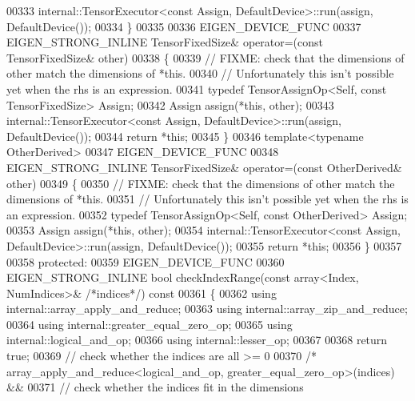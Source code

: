 \begin{DoxyCode}
00333       internal::TensorExecutor<const Assign, DefaultDevice>::run(assign, DefaultDevice());
00334     \}
00335 
00336     EIGEN\_DEVICE\_FUNC
00337     EIGEN\_STRONG\_INLINE TensorFixedSize& operator=(\textcolor{keyword}{const} TensorFixedSize& other)
00338     \{
00339       \textcolor{comment}{// FIXME: check that the dimensions of other match the dimensions of *this.}
00340       \textcolor{comment}{// Unfortunately this isn't possible yet when the rhs is an expression.}
00341       \textcolor{keyword}{typedef} TensorAssignOp<Self, const TensorFixedSize> Assign;
00342       Assign assign(*\textcolor{keyword}{this}, other);
00343       internal::TensorExecutor<const Assign, DefaultDevice>::run(assign, DefaultDevice());
00344       \textcolor{keywordflow}{return} *\textcolor{keyword}{this};
00345     \}
00346     \textcolor{keyword}{template}<\textcolor{keyword}{typename} OtherDerived>
00347     EIGEN\_DEVICE\_FUNC
00348     EIGEN\_STRONG\_INLINE TensorFixedSize& operator=(\textcolor{keyword}{const} OtherDerived& other)
00349     \{
00350       \textcolor{comment}{// FIXME: check that the dimensions of other match the dimensions of *this.}
00351       \textcolor{comment}{// Unfortunately this isn't possible yet when the rhs is an expression.}
00352       \textcolor{keyword}{typedef} TensorAssignOp<Self, const OtherDerived> Assign;
00353       Assign assign(*\textcolor{keyword}{this}, other);
00354       internal::TensorExecutor<const Assign, DefaultDevice>::run(assign, DefaultDevice());
00355       \textcolor{keywordflow}{return} *\textcolor{keyword}{this};
00356     \}
00357 
00358   \textcolor{keyword}{protected}:
00359     EIGEN\_DEVICE\_FUNC
00360     EIGEN\_STRONG\_INLINE \textcolor{keywordtype}{bool} checkIndexRange(\textcolor{keyword}{const} array<Index, NumIndices>& \textcolor{comment}{/*indices*/})\textcolor{keyword}{ const}
00361 \textcolor{keyword}{    }\{
00362       \textcolor{keyword}{using} internal::array\_apply\_and\_reduce;
00363       \textcolor{keyword}{using} internal::array\_zip\_and\_reduce;
00364       \textcolor{keyword}{using} internal::greater\_equal\_zero\_op;
00365       \textcolor{keyword}{using} internal::logical\_and\_op;
00366       \textcolor{keyword}{using} internal::lesser\_op;
00367 
00368       \textcolor{keywordflow}{return} \textcolor{keyword}{true};
00369         \textcolor{comment}{// check whether the indices are all >= 0}
00370           \textcolor{comment}{/*       array\_apply\_and\_reduce<logical\_and\_op, greater\_equal\_zero\_op>(indices) &&}
00371 \textcolor{comment}{        // check whether the indices fit in the dimensions}

\end{DoxyCode}
